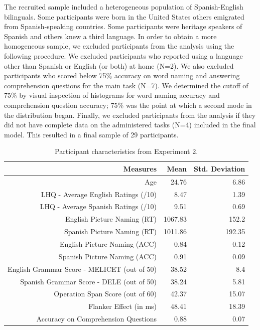The recruited sample included a heterogeneous population of Spanish-English bilinguals. Some participants were born in the United States others emigrated from Spanish-speaking countries. Some participants were heritage speakers of Spanish and others knew a third language. In order to obtain a more homogeneous sample, we excluded participants from the analysis using the following procedure. We excluded participants who reported using a language other than Spanish or English (or both) at home (N=2). We also excluded participants who scored below 75\% accuracy on word naming and answering comprehension questions for the main task (N=7). We determined the cutoff of 75\% by visual inspection of histograms for word naming accuracy and comprehension question accuracy; 75\% was the point at which a second mode in the distribution began. Finally, we excluded participants from the analysis if they did not have complete data on the administered tasks (N=4) included in the final model. This resulted in a final sample of 29 participants.

\begin{table}[htbp]
  \centering
  \caption{Participant characteristics from Experiment 2.}
    \begin{tabular}{rrr}
    \toprule
    Measures & Mean  & Std. Deviation \\
    \midrule
    Age   & 24.76 & 6.86 \\
    LHQ - Average English Ratings (/10) & 8.47  & 1.39 \\
    LHQ - Average Spanish Ratings (/10) & 9.51  & 0.69 \\
    English Picture Naming (RT) & 1067.83 & 152.2 \\
    Spanish Picture Naming (RT) & 1011.86 & 192.35 \\
    English Picture Naming (ACC) & 0.84  & 0.12 \\
    Spanish Picture Naming (ACC) & 0.91  & 0.09 \\
    English Grammar Score - MELICET (out of 50) & 38.52 & 8.4 \\
    Spanish Grammar Score - DELE (out of 50) & 38.24 & 5.81 \\
    Operation Span Score (out of 60) & 42.37 & 15.07 \\
    Flanker Effect (in ms) & 48.41 & 18.39 \\
    Accuracy on Comprehension Questions & 0.88  & 0.07 \\
    \bottomrule
    \end{tabular}%
  \label{tab:incon.bil.subjchar}%
\end{table}%

